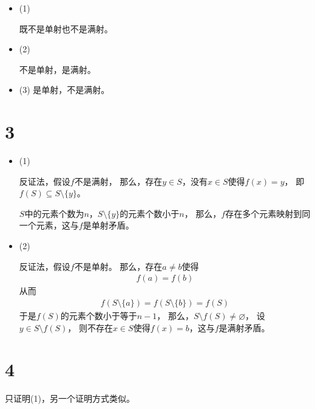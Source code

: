 \documentclass{article}
\begin{document}
\begin{itemize}
      \item (1)

            既不是单射也不是满射。

      \item (2)

            不是单射，是满射。

      \item (3)
            是单射，不是满射。
\end{itemize}

\section*{3}

\begin{itemize}
      \item (1)

            反证法，假设$f$不是满射，
            那么，存在$y \in S$，没有$x \in S$使得$f(x) = y$，
            即$f(S) \subseteq S \setminus \{y\}$。

            $S$中的元素个数为$n$，$S \setminus \{y\}$的元素个数小于$n$，
            那么，$f$存在多个元素映射到同一个元素，这与$f$是单射矛盾。

      \item (2)

            反证法，假设$f$不是单射。
            那么，存在$a \neq b$使得
            \begin{align*}
                  f(a) = f(b)
            \end{align*}
            从而
            \begin{align*}
                  f(S \setminus \{a\}) = f(S \setminus \{b\}) = f(S)
            \end{align*}
            于是$f(S)$的元素个数小于等于$n - 1$，
            那么，$ S \setminus f(S) \neq \varnothing$，
            设$y \in S \setminus f(S)$，
            则不存在$x \in S$使得$f(x) = b$，这与$f$是满射矛盾。
\end{itemize}

\section*{4}

只证明(1)，另一个证明方式类似。
\end{document}

